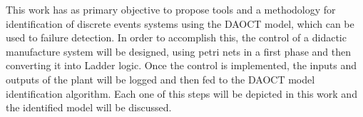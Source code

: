 \begin{foreignabstract}

This work has as primary objective to propose tools and a methodology
for identification of discrete events systems
using the \gls{DAOCT} model, which can be used to failure detection.
In order to accomplish this, the control
of a didactic manufacture system will be designed, using petri nets in
a first phase and then converting it into Ladder logic. Once the control is
implemented, the inputs and outputs of the plant will be logged and then
fed to the \gls{DAOCT} model identification
algorithm. Each one of this steps will be depicted in this work and the identified
model will be discussed.



\end{foreignabstract}

